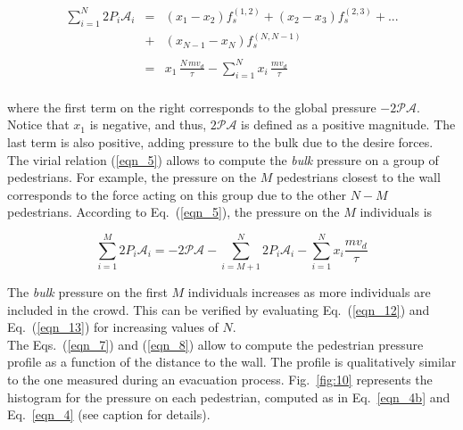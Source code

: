 \begin{equation}
\begin{array}{lcl}
\displaystyle\sum_{i=1}^N 2P_i\mathcal{A}_i & = & (x_1 - x_2)f_s^{(1,2)} + (x_2 
- 
x_3)f_s^{(2,3)} +... \\
& + &  (x_{N-1}-x_N)f_s^{(N,N-1)} \\
&& \\
& = & x_{1}\,\displaystyle\frac{N\,mv_d}{\tau} - 
\displaystyle\sum_{i=1}^N x_i\,\displaystyle\frac{mv_d}{\tau} \\
 \end{array}\label{eqn_12}
\end{equation}

\noindent where the first term on the right corresponds to the global pressure 
$-2\mathcal{PA}$. Notice that $x_1$ is negative, and thus, $2\mathcal{PA}$ is 
defined as a positive magnitude. The last term is also positive, adding 
pressure to the bulk due to the desire forces.  
\\

The virial relation (\ref{eqn_5}) allows to compute the \textit{bulk} pressure 
on a group of pedestrians. For example, the pressure on the $M$ pedestrians 
closest to the wall corresponds to the force acting on this group due to the 
other $N-M$ pedestrians. According to Eq.~(\ref{eqn_5}), the 
pressure on the $M$ individuals is    


\begin{equation}
 \displaystyle\sum_{i=1}^M 2P_i\mathcal{A}_i 
=-2\mathcal{PA}-\displaystyle\sum_{i=M+1}^N 
2P_i\mathcal{A}_i-\displaystyle\sum_{i=1}^N 
x_i\displaystyle\frac{mv_d}{\tau}\label{eqn_13}
\end{equation}


The \textit{bulk} pressure on the first $M$ individuals increases as more 
individuals are included in the crowd. This can be verified by evaluating 
Eq.~(\ref{eqn_12}) and Eq.~(\ref{eqn_13}) for increasing values of $N$. \\

The Eqs.~(\ref{eqn_7}) and (\ref{eqn_8}) allow to compute the pedestrian 
pressure profile as a function of the distance to the wall. The profile is 
qualitatively similar to the one measured during an evacuation process. 
Fig.~\ref{fig:10} represents the histogram for the pressure on each 
pedestrian, computed as in Eq.~\ref{eqn_4b} and Eq.~\ref{eqn_4} (see caption for
details). \\


